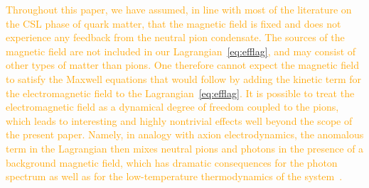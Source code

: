 
\textcolor{orange}{Throughout this paper, we have assumed, in line with most of the literature on the CSL phase of quark matter, that the magnetic field is fixed and does not experience any feedback from the neutral pion condensate. The sources of the magnetic field are not included in our Lagrangian~\eqref{eq:efflag}, and may consist of other types of matter than pions. One therefore cannot expect the magnetic field to satisfy the Maxwell equations that would follow by adding the kinetic term for the electromagnetic field to the Lagrangian~\eqref{eq:efflag}. It is possible to treat the electromagnetic field as a dynamical degree of freedom coupled to the pions, which leads to interesting and highly nontrivial effects well beyond the scope of the present paper. Namely, in analogy with axion electrodynamics, the anomalous term in the Lagrangian then mixes neutral pions and photons in the presence of a background magnetic field, which has dramatic consequences for the photon spectrum as well as for the low-temperature thermodynamics of the system~\cite{Yamamoto:2015maz,Brauner:2017mui}.}



